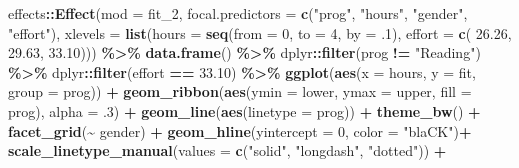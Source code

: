 \documentclass[
]{article}
\newenvironment{Shaded}{\begin{snugshade}}{\end{snugshade}}
\newcommand{\AttributeTok}[1]{\textcolor[rgb]{0.13,0.29,0.53}{#1}}
\newcommand{\DecValTok}[1]{\textcolor[rgb]{0.00,0.00,0.81}{#1}}
\newcommand{\FloatTok}[1]{\textcolor[rgb]{0.00,0.00,0.81}{#1}}
\newcommand{\FunctionTok}[1]{\textcolor[rgb]{0.13,0.29,0.53}{\textbf{#1}}}
\newcommand{\NormalTok}[1]{#1}
\newcommand{\SpecialCharTok}[1]{\textcolor[rgb]{0.81,0.36,0.00}{\textbf{#1}}}
\newcommand{\StringTok}[1]{\textcolor[rgb]{0.31,0.60,0.02}{#1}}
\begin{document}
\begin{Shaded}
\begin{Highlighting}[]
\NormalTok{effects}\SpecialCharTok{::}\FunctionTok{Effect}\NormalTok{(}\AttributeTok{mod =}\NormalTok{ fit\_2,}
                \AttributeTok{focal.predictors =} \FunctionTok{c}\NormalTok{(}\StringTok{"prog"}\NormalTok{, }\StringTok{"hours"}\NormalTok{, }
                                     \StringTok{"gender"}\NormalTok{, }\StringTok{"effort"}\NormalTok{),}
                \AttributeTok{xlevels =} \FunctionTok{list}\NormalTok{(}\AttributeTok{hours =} \FunctionTok{seq}\NormalTok{(}\AttributeTok{from =} \DecValTok{0}\NormalTok{,}
                                           \AttributeTok{to =} \DecValTok{4}\NormalTok{,}
                                           \AttributeTok{by =}\NormalTok{ .}\DecValTok{1}\NormalTok{),}
                               \AttributeTok{effort =} \FunctionTok{c}\NormalTok{( }\FloatTok{26.26}\NormalTok{, }\FloatTok{29.63}\NormalTok{, }\FloatTok{33.10}\NormalTok{))) }\SpecialCharTok{\%\textgreater{}\%} 
  \FunctionTok{data.frame}\NormalTok{() }\SpecialCharTok{\%\textgreater{}\%} 
\NormalTok{  dplyr}\SpecialCharTok{::}\FunctionTok{filter}\NormalTok{(prog }\SpecialCharTok{!=} \StringTok{"Reading"}\NormalTok{) }\SpecialCharTok{\%\textgreater{}\%} 
\NormalTok{  dplyr}\SpecialCharTok{::}\FunctionTok{filter}\NormalTok{(effort }\SpecialCharTok{==} \FloatTok{33.10}\NormalTok{) }\SpecialCharTok{\%\textgreater{}\%} 
  \FunctionTok{ggplot}\NormalTok{(}\FunctionTok{aes}\NormalTok{(}\AttributeTok{x =}\NormalTok{ hours,}
             \AttributeTok{y =}\NormalTok{ fit,}
             \AttributeTok{group =}\NormalTok{ prog)) }\SpecialCharTok{+}
  \FunctionTok{geom\_ribbon}\NormalTok{(}\FunctionTok{aes}\NormalTok{(}\AttributeTok{ymin =}\NormalTok{ lower,}
                  \AttributeTok{ymax =}\NormalTok{ upper,}
                  \AttributeTok{fill =}\NormalTok{ prog),}
              \AttributeTok{alpha =}\NormalTok{ .}\DecValTok{3}\NormalTok{) }\SpecialCharTok{+}
  \FunctionTok{geom\_line}\NormalTok{(}\FunctionTok{aes}\NormalTok{(}\AttributeTok{linetype =}\NormalTok{ prog)) }\SpecialCharTok{+}
  \FunctionTok{theme\_bw}\NormalTok{() }\SpecialCharTok{+}
  \FunctionTok{facet\_grid}\NormalTok{(}\SpecialCharTok{\textasciitilde{}}\NormalTok{ gender) }\SpecialCharTok{+}
  \FunctionTok{geom\_hline}\NormalTok{(}\AttributeTok{yintercept =} \DecValTok{0}\NormalTok{,}
             \AttributeTok{color =} \StringTok{"blaCK"}\NormalTok{)}\SpecialCharTok{+}
  \FunctionTok{scale\_linetype\_manual}\NormalTok{(}\AttributeTok{values =} \FunctionTok{c}\NormalTok{(}\StringTok{"solid"}\NormalTok{, }\StringTok{"longdash"}\NormalTok{, }\StringTok{"dotted"}\NormalTok{)) }\SpecialCharTok{+}

\end{Highlighting}
\end{Shaded}
\end{document}
